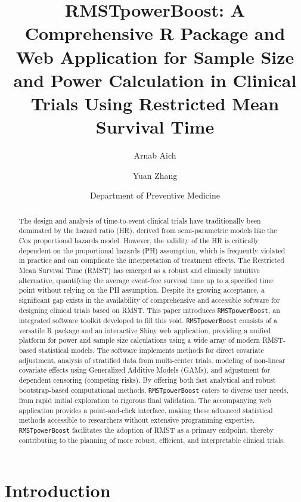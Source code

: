 \documentclass[11pt, a4paper]{article}
\begin{document}
\title{\textbf{RMSTpowerBoost: A Comprehensive R Package and Web Application for Sample Size and Power Calculation in Clinical Trials Using Restricted Mean Survival Time}}
\author{Arnab Aich \and Yuan Zhang}
\date{Department of Preventive Medicine}
\maketitle

\begin{abstract}
The design and analysis of time-to-event clinical trials have traditionally been dominated by the hazard ratio (HR), derived from semi-parametric models like the Cox proportional hazards model. However, the validity of the HR is critically dependent on the proportional hazards (PH) assumption, which is frequently violated in practice and can complicate the interpretation of treatment effects. The Restricted Mean Survival Time (RMST) has emerged as a robust and clinically intuitive alternative, quantifying the average event-free survival time up to a specified time point without relying on the PH assumption. Despite its growing acceptance, a significant gap exists in the availability of comprehensive and accessible software for designing clinical trials based on RMST. This paper introduces \texttt{RMSTpowerBoost}, an integrated software toolkit developed to fill this void. \texttt{RMSTpowerBoost} consists of a versatile R package and an interactive Shiny web application, providing a unified platform for power and sample size calculations using a wide array of modern RMST-based statistical models. The software implements methods for direct covariate adjustment, analysis of stratified data from multi-center trials, modeling of non-linear covariate effects using Generalized Additive Models (GAMs), and adjustment for dependent censoring (competing risks). By offering both fast analytical and robust bootstrap-based computational methods, \texttt{RMSTpowerBoost} caters to diverse user needs, from rapid initial exploration to rigorous final validation. The accompanying web application provides a point-and-click interface, making these advanced statistical methods accessible to researchers without extensive programming expertise. \texttt{RMSTpowerBoost} facilitates the adoption of RMST as a primary endpoint, thereby contributing to the planning of more robust, efficient, and interpretable clinical trials.
\end{abstract}

\section{Introduction}
\end{document}
